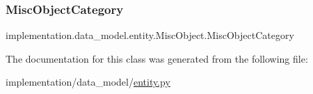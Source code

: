 \subsubsection{\texorpdfstring{Misc\+Object\+Category}{MiscObjectCategory}}
{\footnotesize\ttfamily implementation.\+data\+\_\+model.\+entity.\+Misc\+Object.\+Misc\+Object\+Category\hspace{0.3cm}{\ttfamily [static]}}



The documentation for this class was generated from the following file\+:\begin{DoxyCompactItemize}
\item 
implementation/data\+\_\+model/\hyperlink{entity_8py}{entity.\+py}\end{DoxyCompactItemize}
